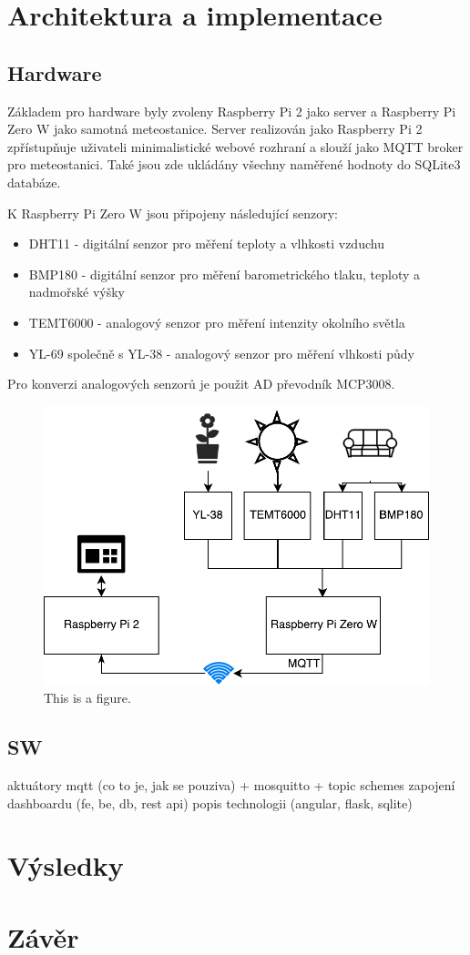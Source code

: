 \documentclass[11pt,a4paper]{article}
\begin{document}
\section{Architektura a implementace}
\subsection{Hardware}
Základem pro hardware byly zvoleny Raspberry Pi 2 jako server a Raspberry Pi Zero W jako samotná meteostanice. Server realizován jako Raspberry Pi 2 zpřístupňuje uživateli minimalistické webové rozhraní a slouží jako MQTT broker pro meteostanici. Také jsou zde ukládány všechny naměřené hodnoty do SQLite3 databáze.

K Raspberry Pi Zero W jsou připojeny následující senzory:

\begin{itemize}
    \item DHT11 - digitální senzor pro měření teploty a vlhkosti vzduchu
    \item BMP180 - digitální senzor pro měření barometrického tlaku, teploty a nadmořské výšky
    \item TEMT6000 - analogový senzor pro měření intenzity okolního světla
    \item YL-69 společně s YL-38 - analogový senzor pro měření vlhkosti půdy
\end{itemize}

Pro konverzi analogových senzorů je použit AD převodník MCP3008.


\begin{figure}[htb]
    \centering
    \includegraphics[width=0.5\linewidth]{weather-station-scheme}
    \caption{This is a figure.}
\end{figure}


\subsection{SW}
aktuátory
mqtt (co to je, jak se pouziva) + mosquitto + topic schemes
zapojení dashboardu (fe, be, db, rest api)
popis technologii (angular, flask, sqlite)

\section{Výsledky}
\label{sec:res}

\section{Závěr}
\label{sec:sum}
\end{document}
